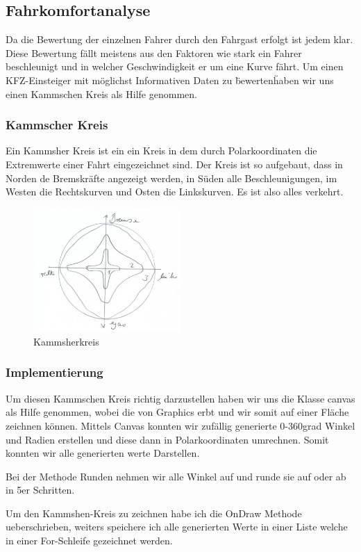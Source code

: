 \subsection{Fahrkomfortanalyse}


Da die Bewertung der einzelnen Fahrer durch den Fahrgast erfolgt ist jedem klar.
Diese Bewertung fällt meistens aus den Faktoren wie stark ein Fahrer beschleunigt und in welcher Geschwindigkeit er um eine Kurve fährt.
Um einen KFZ-Einsteiger mit möglichst Informativen Daten zu \"bewerten\" haben wir uns einen Kammschen Kreis als Hilfe genommen.

\subsubsection{Kammscher Kreis }
Ein Kammsher Kreis ist ein ein Kreis in dem durch Polarkoordinaten die Extremwerte einer Fahrt eingezeichnet sind.
Der Kreis ist so aufgebaut, dass in Norden de Bremskräfte angezeigt werden, in Süden alle Beschleunigungen, im Westen die Rechtskurven und Osten die Linkskurven.
Es ist also alles verkehrt.
\begin{figure}[!htb]\centering
	\includegraphics[width=0.5\textwidth]{images/kammsherkreis}
	\caption{Kammsherkreis \cite{FAIF.CH3-fahrkomfortanalyse.KammscherKreis}}\label{Fig:Kammsher-Kreis}
\end{figure}

\subsubsection{Implementierung}
Um diesen Kammschen Kreis richtig darzustellen haben wir uns die Klasse canvas als Hilfe genommen, wobei die von Graphics erbt und wir somit auf einer Fläche zeichnen können.
Mittels Canvas konnten wir zufällig generierte 0-360grad Winkel und Radien erstellen und diese dann in Polarkoordinaten umrechnen.
Somit konnten wir alle generierten werte Darstellen. 



Bei der Methode Runden nehmen wir alle Winkel auf und runde sie auf oder ab in 5er Schritten.
\newline 



Um den Kammshen-Kreis zu zeichnen habe ich die OnDraw Methode ueberschrieben, weiters speichere ich alle generierten Werte in einer Liste welche in einer For-Schleife gezeichnet werden.